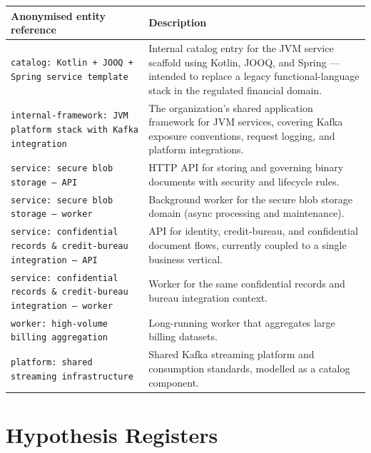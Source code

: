 \noindent\begin{minipage}{\linewidth}
\centering\small
\setlength{\tabcolsep}{5pt}
\begin{tabular}{p{5.2cm}p{7.8cm}}
\toprule
\textbf{Anonymised entity reference} & \textbf{Description} \\
\midrule
\texttt{catalog: Kotlin + JOOQ + Spring service template}
  & Internal catalog entry for the JVM service scaffold using Kotlin, JOOQ, and
    Spring — intended to replace a legacy functional-language stack in the
    regulated financial domain. \\[4pt]
\texttt{internal-framework: JVM platform stack with Kafka integration}
  & The organization's shared application framework for JVM services, covering
    Kafka exposure conventions, request logging, and platform integrations. \\[4pt]
\texttt{service: secure blob storage — API}
  & HTTP API for storing and governing binary documents with security and
    lifecycle rules. \\[4pt]
\texttt{service: secure blob storage — worker}
  & Background worker for the secure blob storage domain (async processing and
    maintenance). \\[4pt]
\texttt{service: confidential records \& credit-bureau integration — API}
  & API for identity, credit-bureau, and confidential document flows, currently
    coupled to a single business vertical. \\[4pt]
\texttt{service: confidential records \& credit-bureau integration — worker}
  & Worker for the same confidential records and bureau integration context. \\[4pt]
\texttt{worker: high-volume billing aggregation}
  & Long-running worker that aggregates large billing datasets. \\[4pt]
\texttt{platform: shared streaming infrastructure}
  & Shared Kafka streaming platform and consumption standards, modelled as a
    catalog component. \\
\bottomrule
\end{tabular}
\label{tab:entity-legend}
\end{minipage}
\par\bigskip

\section{Hypothesis Registers}
\label{sec:app-hypothesis-registers}


